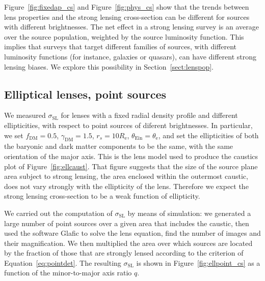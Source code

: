 \documentclass{aa}
\def\reff{R_{\mathrm{e}}}
\def\mstar{M_*}
\def\gammadm{\gamma_{\mathrm{DM}}}
\def\fdm{f_{\mathrm{DM}}}
\def\mdmfive{M_{\mathrm{DM}, 5}}
\def\tein{\theta_{\mathrm{Ein}}}
\def\teff{\theta_{\mathrm{e}}}
\def\crosssect{\sigma_\mathrm{{SL}}}
\def\Sref#1{Section~\ref{#1}\xspace}
\def\Fref#1{Figure~\ref{#1}\xspace}
\def\Eref#1{Equation~\ref{#1}\xspace}
\begin{document}
\Fref{fig:fixedap_cs} and \Fref{fig:phys_cs} show that the trends between lens properties and the strong lensing cross-section can be different for sources with different brightnesses.
The net effect in a strong lensing survey is an average over the source population, weighted by the source luminosity function. 
This implies that surveys that target different families of sources, with different luminosity functions (for instance, galaxies or quasars), can have different strong lensing biases. We explore this possibility in \Sref{sect:lenspop}.

\subsection{Elliptical lenses, point sources}\label{ssec:ellpoint}

We measured $\crosssect$ for lenses with a fixed radial density profile and different ellipticities, with respect to point sources of diferent brightnesses.
In particular, we set $\fdm=0.5$, $\gammadm=1.5$, $r_s=10\reff$, $\tein=\teff$, and set the ellipticities of both the baryonic and dark matter components to be the same, with the same orientation of the major axis.
This is the lens model used to produce the caustics plot of \Fref{fig:ellcaust}.
That figure suggests that the size of the source plane area subject to strong lensing, the area enclosed within the outermost caustic, does not vary strongly with the ellipticity of the lens.
Therefore we expect the strong lensing cross-section to be a weak function of ellipticity.

We carried out the computation of $\crosssect$ by means of simulation: we generated a large number of point sources over a given area that includes the caustic, then used the software {\sc Glafic} \citep{Ogu21} to solve the lens equation, find the number of images and their magnification. We then multiplied the area over which sources are located by the fraction of those that are strongly lensed according to the criterion of \Eref{eq:pointdet}.
The resulting $\crosssect$ is shown in \Fref{fig:ellpoint_cs} as a function of the minor-to-major axis ratio $q$.
\end{document}
